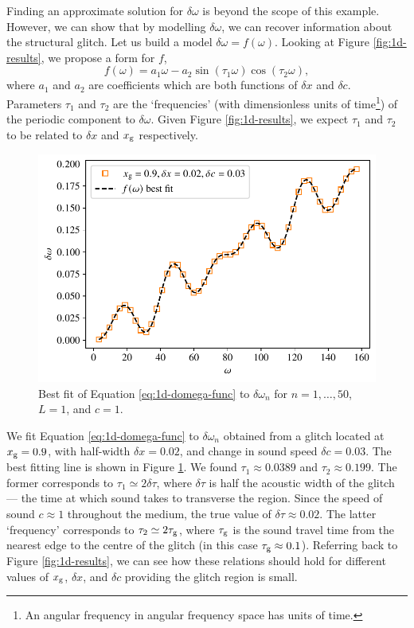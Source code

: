 Finding an approximate solution for \(\delta\omega\) is beyond the scope of this example. However, we can show that by modelling \(\delta\omega\), we can recover information about the structural glitch. Let us build a model \(\delta\omega = f(\omega)\). Looking at Figure \ref{fig:1d-results}, we propose a form for \(f\),
%
\begin{equation}
    f(\omega) = a_1 \omega - a_2 \sin (\tau_1 \omega) \cos (\tau_2 \omega), \label{eq:1d-domega-func}
\end{equation}
%
where \(a_1\) and \(a_2\) are coefficients which are both functions of \(\delta x\) and \(\delta c\). Parameters \(\tau_1\) and \(\tau_2\) are the `frequencies' (with dimensionless units of time\footnote{An angular frequency in angular frequency space has units of time.}) of the periodic component to \(\delta\omega\). Given Figure \ref{fig:1d-results}, we expect \(\tau_1\) and \(\tau_2\) to be related to \(\delta x\) and \(x_{{\mathrm{g}}}\) respectively.

\begin{figure}[tb]
    \centering
    \includegraphics{figures/glitch-1d-fit.pdf}
    \caption{Best fit of Equation \ref{eq:1d-domega-func} to \(\delta\omega_n\) for \(n=1,\dots,50\), \(L=1\), and \(c=1\).}
    \label{fig:1d-fit}
\end{figure}

We fit Equation \ref{eq:1d-domega-func} to \(\delta\omega_n\) obtained from a glitch located at \(x_{{\mathrm{g}}} = 0.9\), with half-width \(\delta x = 0.02\), and change in sound speed \(\delta c = 0.03\). The best fitting line is shown in Figure \ref{fig:1d-fit}. We found \(\tau_1 \approx \num{0.0389}\) and \(\tau_2 \approx \num{0.199}\). The former corresponds to \(\tau_1 \simeq 2\delta\tau\), where \(\delta\tau\) is half the acoustic width of the glitch --- the time at which sound takes to transverse the region. Since the speed of sound \(c \approx \num{1}\) throughout the medium, the true value of \(\delta\tau \approx 0.02\). The latter `frequency' corresponds to \(\tau_2 \simeq 2\tau_{{\mathrm{g}}}\), where \(\tau_{{\mathrm{g}}}\) is the sound travel time from the nearest edge to the centre of the glitch (in this case \(\tau_{{\mathrm{g}}} \approx 0.1\)). Referring back to Figure \ref{fig:1d-results}, we can see how these relations should hold for different values of \(x_{{\mathrm{g}}}\), \(\delta x\), and \(\delta c\) providing the glitch region is small.

